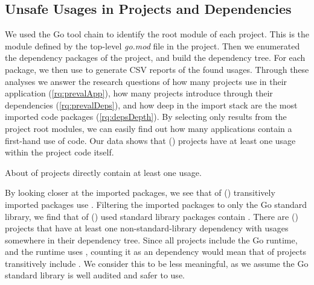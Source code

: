 \subsection{Unsafe Usages in Projects and Dependencies}

We used the Go tool chain to identify the root module of each project. 
This is the module defined by the top-level \textit{go.mod} file in the project.
Then we enumerated the dependency packages of the project, and build the dependency tree.
For each package, we then use \toolUsage{} to generate CSV reports of the found \unsafe{} usages.
Through these analyses we answer the research questions of how many projects use \unsafe{} in their application (\ref{rq:prevalApp}), how many projects introduce \unsafe{} through their dependencies (\ref{rq:prevalDeps}), and how deep in the import stack are the most imported \unsafe{} code packages (\ref{rq:depsDepth}). 
By selecting only results from the project root modules, we can easily find out how many applications contain a first-hand use of \unsafe{} code.
Our data shows that  () projects have at least one \unsafe{} usage within the project code itself.

\begin{tcolorbox}[boxsep=1pt, enlarge top by=5pt, title=Answer to \ref{rq:prevalApp}]
About  of projects directly contain at least one \unsafe{} usage.
\end{tcolorbox}


By looking closer at the imported packages, we see that  of  () transitively imported packages use \unsafe{}. 
Filtering the imported packages to only the Go standard library, we find that  of  () used standard library packages contain \unsafe{}.
There are  () projects that have at least one non-standard-library dependency with \unsafe{} usages somewhere in their dependency tree.
Since all projects include the Go runtime, and the runtime uses \unsafe{}, counting it as an \unsafe{} dependency would mean that  of projects transitively include \unsafe{}.
We consider this to be less meaningful, as we assume the Go standard library is well audited and safer to use.

